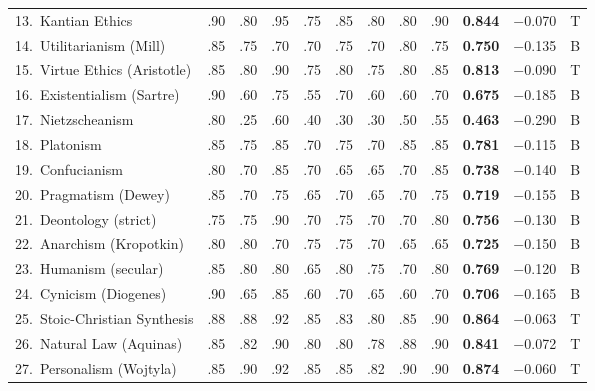 \documentclass[11pt,a4paper]{article}
\theoremstyle{definition}
\theoremstyle{remark}
\begin{document}
\begin{longtable}{@{}l|cccccccc|cc|c@{}}
13.\ Kantian Ethics
  & .90 & .80 & .95 & .75 & .85 & .80 & .80 & .90
  & \textbf{0.844} & $-$0.070 & \textcolor{survival}{T} \\
14.\ Utilitarianism (Mill)
  & .85 & .75 & .70 & .70 & .75 & .70 & .80 & .75
  & \textbf{0.750} & $-$0.135 & \textcolor{borderline}{B} \\
15.\ Virtue Ethics (Aristotle)
  & .85 & .80 & .90 & .75 & .80 & .75 & .80 & .85
  & \textbf{0.813} & $-$0.090 & \textcolor{survival}{T} \\
16.\ Existentialism (Sartre)
  & .90 & .60 & .75 & .55 & .70 & .60 & .60 & .70
  & \textbf{0.675} & $-$0.185 & \textcolor{borderline}{B} \\
17.\ Nietzscheanism
  & .80 & .25 & .60 & .40 & .30 & .30 & .50 & .55
  & \textbf{0.463} & $-$0.290 & \textcolor{borderline}{B} \\
18.\ Platonism
  & .85 & .75 & .85 & .70 & .75 & .70 & .85 & .85
  & \textbf{0.781} & $-$0.115 & \textcolor{borderline}{B} \\
19.\ Confucianism
  & .80 & .70 & .85 & .70 & .65 & .65 & .70 & .85
  & \textbf{0.738} & $-$0.140 & \textcolor{borderline}{B} \\
20.\ Pragmatism (Dewey)
  & .85 & .70 & .75 & .65 & .70 & .65 & .70 & .75
  & \textbf{0.719} & $-$0.155 & \textcolor{borderline}{B} \\
21.\ Deontology (strict)
  & .75 & .75 & .90 & .70 & .75 & .70 & .70 & .80
  & \textbf{0.756} & $-$0.130 & \textcolor{borderline}{B} \\
22.\ Anarchism (Kropotkin)
  & .80 & .80 & .70 & .75 & .75 & .70 & .65 & .65
  & \textbf{0.725} & $-$0.150 & \textcolor{borderline}{B} \\
23.\ Humanism (secular)
  & .85 & .80 & .80 & .65 & .80 & .75 & .70 & .80
  & \textbf{0.769} & $-$0.120 & \textcolor{borderline}{B} \\
24.\ Cynicism (Diogenes)
  & .90 & .65 & .85 & .60 & .70 & .65 & .60 & .70
  & \textbf{0.706} & $-$0.165 & \textcolor{borderline}{B} \\
25.\ Stoic-Christian Synthesis
  & .88 & .88 & .92 & .85 & .83 & .80 & .85 & .90
  & \textbf{0.864} & $-$0.063 & \textcolor{survival}{T} \\
26.\ Natural Law (Aquinas)
  & .85 & .82 & .90 & .80 & .80 & .78 & .88 & .90
  & \textbf{0.841} & $-$0.072 & \textcolor{survival}{T} \\
27.\ Personalism (Wojtyla)
  & .85 & .90 & .92 & .85 & .85 & .82 & .90 & .90
  & \textbf{0.874} & $-$0.060 & \textcolor{survival}{T} \\

\end{longtable}
\end{document}
